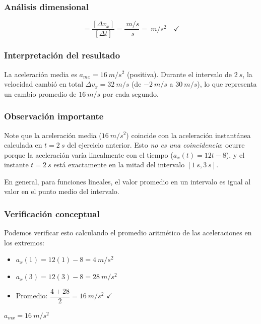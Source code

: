\documentclass[12pt, a4paper]{article}
\begin{document}
\subsubsection*{Análisis dimensional}
\begin{equation*}
[a_{mx}] = \frac{[\Delta v_x]}{[\Delta t]} = \frac{\SI{}{m/s}}{\SI{}{s}} = \SI{}{m/s^2} \quad \checkmark
\end{equation*}

\subsubsection*{Interpretación del resultado}
La aceleración media es $a_{mx} = \SI{16}{m/s^2}$ (positiva). Durante el intervalo de $\SI{2}{s}$, la velocidad cambió en total $\Delta v_x = \SI{32}{m/s}$ (de $\SI{-2}{m/s}$ a $\SI{30}{m/s}$), lo que representa un cambio promedio de $\SI{16}{m/s}$ por cada segundo.

\subsubsection*{Observación importante}
Note que la aceleración media ($\SI{16}{m/s^2}$) coincide con la aceleración instantánea calculada en $t = \SI{2}{s}$ del ejercicio anterior. Esto \textit{no es una coincidencia}: ocurre porque la aceleración varía linealmente con el tiempo ($a_x(t) = 12t - 8$), y el instante $t = \SI{2}{s}$ está exactamente en la mitad del intervalo $[\SI{1}{s}, \SI{3}{s}]$. 

En general, para funciones lineales, el valor promedio en un intervalo es igual al valor en el punto medio del intervalo.

\subsubsection*{Verificación conceptual}
Podemos verificar esto calculando el promedio aritmético de las aceleraciones en los extremos:
\begin{itemize}
    \item $a_x(1) = 12(1) - 8 = \SI{4}{m/s^2}$
    \item $a_x(3) = 12(3) - 8 = \SI{28}{m/s^2}$
    \item Promedio: $\dfrac{4 + 28}{2} = \SI{16}{m/s^2}$ \quad $\checkmark$
\end{itemize}

\begin{tcolorbox}[colback=blue!5!white, colframe=blue!75!black, title=Respuesta Final]
\centering
\Large $\boxed{a_{mx} = \SI{16}{m/s^2}}$
\end{tcolorbox}
\end{document}
